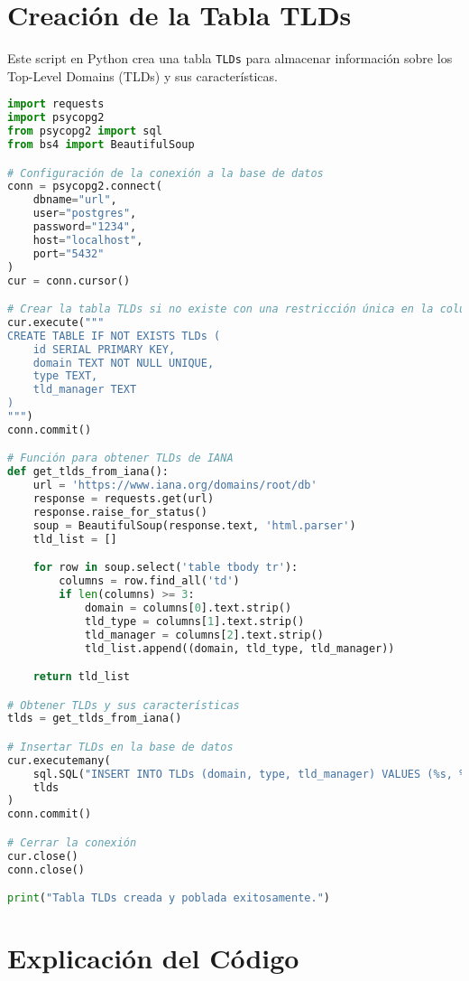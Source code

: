 \section*{Creación de la Tabla TLDs}

Este script en Python crea una tabla \texttt{TLDs} para almacenar información sobre los Top-Level Domains (TLDs) y sus características.

\begin{lstlisting}[language=Python, caption=Creación de la tabla TLDs con restricción única]
import requests
import psycopg2
from psycopg2 import sql
from bs4 import BeautifulSoup

# Configuración de la conexión a la base de datos
conn = psycopg2.connect(
    dbname="url",
    user="postgres",
    password="1234",
    host="localhost",
    port="5432"
)
cur = conn.cursor()

# Crear la tabla TLDs si no existe con una restricción única en la columna DOMAIN
cur.execute("""
CREATE TABLE IF NOT EXISTS TLDs (
    id SERIAL PRIMARY KEY,
    domain TEXT NOT NULL UNIQUE,
    type TEXT,
    tld_manager TEXT
)
""")
conn.commit()

# Función para obtener TLDs de IANA
def get_tlds_from_iana():
    url = 'https://www.iana.org/domains/root/db'
    response = requests.get(url)
    response.raise_for_status()
    soup = BeautifulSoup(response.text, 'html.parser')
    tld_list = []

    for row in soup.select('table tbody tr'):
        columns = row.find_all('td')
        if len(columns) >= 3:
            domain = columns[0].text.strip()
            tld_type = columns[1].text.strip()
            tld_manager = columns[2].text.strip()
            tld_list.append((domain, tld_type, tld_manager))

    return tld_list

# Obtener TLDs y sus características
tlds = get_tlds_from_iana()

# Insertar TLDs en la base de datos
cur.executemany(
    sql.SQL("INSERT INTO TLDs (domain, type, tld_manager) VALUES (%s, %s, %s) ON CONFLICT (domain) DO NOTHING"),
    tlds
)
conn.commit()

# Cerrar la conexión
cur.close()
conn.close()

print("Tabla TLDs creada y poblada exitosamente.")
\end{lstlisting}

\section*{Explicación del Código}

